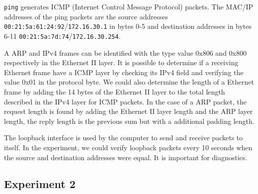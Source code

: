 \documentclass[a4paper, 11pt]{report}
\begin{document}
\texttt{ping} generates ICMP (Internet Control Message Protocol) packets. The MAC/IP addresses of the ping packets are the source addresses \texttt{00:21:5a:61:24:92}/\texttt{172.16.30.1} in bytes 0-5
and destination addresses in bytes 6-11 \texttt{00:21:5a:7d:74}/\texttt{172.16.30.254}.

A ARP and IPv4 frames can be identified with the type value 0x806 and 0x800 respectively in the Ethernet II layer.
It is possible to determine if a receiving Ethernet frame have a ICMP layer by checking its IPv4 field and verifying the value 0x01 in the protocol byte.
We could also determine the length of a Ethernet frame by adding the 14 bytes of the Ethernet II layer to the total length described in the IPv4 layer for ICMP packets.
In the case of a ARP packet, the request length is found by adding the Ethernet II layer length and the ARP layer length, the reply length is the previous sum but with a additional padding length. 

The loopback interface is used by the computer to send and receive packets to itself.
In the experiment, we could verify loopback packets every 10 seconds when the source and destination addresses were equal.
It is important for diagnostics.


\subsection{Experiment 2} \label{sec:Exp2}
\end{document}
